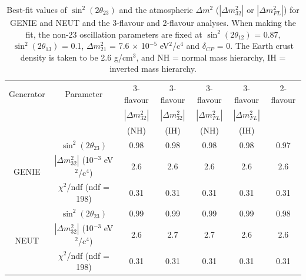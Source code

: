 \begin{table}
\caption[Best-fit values of $\sin^{2}(2 \theta_{23})$ and the atmospheric $\Delta m^{2}$ ($|\Delta m_{32}^{2}|$ or $|\Delta m_{FL}^{2}|$) 
for GENIE and NEUT and the 3-flavour and 2-flavour analyses]
{Best-fit values of $\sin^{2}(2 \theta_{23})$ and the atmospheric $\Delta m^{2}$ ($|\Delta m_{32}^{2}|$ or $|\Delta m_{FL}^{2}|$)
for GENIE and NEUT and the 3-flavour and 2-flavour analyses. When making the fit, the non-23 oscillation parameters are fixed at 
$\sin^{2}(2 \theta_{12})$ = 0.87, $\sin^{2}(2 \theta_{13})$ = 0.1, $\Delta m_{21}^{2}$ = 7.6 $\times$ 10$^{-5}$ eV$^{2}$/c$^{4}$ and 
$\delta_{CP}$ = 0. The Earth crust density is taken to be 2.6 g/cm$^{3}$, and NH = normal mass hierarchy, IH = inverted mass hierarchy.}
\centering
\begin{tabular}{| c | c | c | c | c | c | c |}
\hline
Generator & Parameter & 3-flavour & 3-flavour & 3-flavour & 3-flavour & 2-flavour\\
 &  & $|\Delta m_{32}^{2}|$ & $|\Delta m_{32}^{2}|$ & $|\Delta m_{FL}^{2}|$ & $|\Delta m_{FL}^{2}|$ & \\
 &  & (NH) & (IH) & (NH) & (IH) &  \\
\hline
 \multirow{3}{*}{GENIE} & $\sin^{2}(2 \theta_{23})$ & 0.98 & 0.98 & 0.98 & 0.98 & 0.97 \\
 & $|\Delta m_{32}^{2}|$ (10$^{-3}$ eV$^{2}$/c$^{4}$) & 2.6 & 2.6 & 2.6 & 2.6 & 2.6\\
 & $\chi^{2}$/ndf (ndf = 198) & 0.31 & 0.31 & 0.31 & 0.31 & 0.31\\
\hline
\multirow{3}{*}{NEUT} & $\sin^{2}(2 \theta_{23})$ & 0.99 & 0.99 & 0.99 & 0.99 & 0.98 \\
 & $|\Delta m_{32}^{2}|$ (10$^{-3}$ eV$^{2}$/c$^{4}$) & 2.6 & 2.7 & 2.7 & 2.6 & 2.6 \\
 & $\chi^{2}$/ndf (ndf = 198) & 0.31 & 0.31 & 0.31 & 0.31 & 0.31 \\
\hline
\end{tabular}
\label{bestfitoscparameters}
\end{table}

